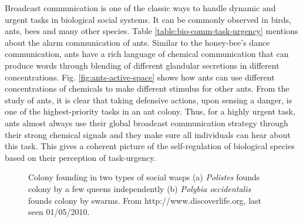 Broadcast communication is one of the classic ways to handle dynamic and urgent tasks in biological social systems. It can be commonly observed in birds, ants, bees and many other species. Table \ref{table:bio-comm-task-urgency} mentions about the alarm communication of ants. Similar to the honey-bee's dance communication, ants have a rich language of chemical communication that can produce words through blending of different glandular secretions in different concentrations. Fig. \ref{fig:ants-active-space} shows how ants can use different concentrations of chemicals to make different stimulus for other ants. From the study of ants, it is clear that taking defensive actions, upon sensing a danger, is one of the highest-priority tasks in an ant colony. Thus, for a highly urgent task, ants almost always use their global broadcast communication strategy through their strong chemical signals and they make sure all individuals can hear about this task.  This gives a coherent picture of the self-regulation of biological species based on their perception of task-urgency.
\begin{figure}
\centering
{}
\hspace{0.25cm}
\caption{Colony founding in two types of social wasps (a) {\em Polistes}  founds colony by a few queens independently (b) {\em Polybia occidentalis}  founds colony by swarms. From http://www.discoverlife.org, last seen 01/05/2010.}
\label{fig:social-wasps}
\end{figure}
